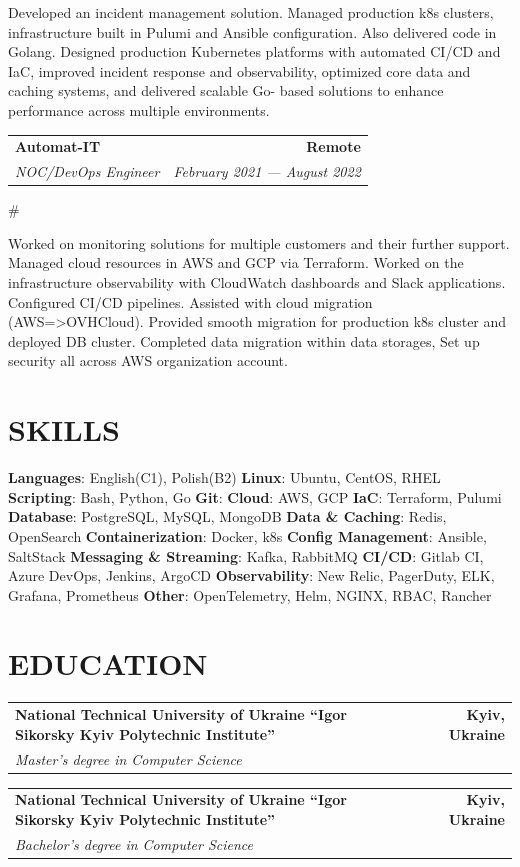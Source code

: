 \documentclass[letterpaper,11pt]{article}
\makeatletter
\newcommand{\resumeSubheadingSimple}[4]{
  \vspace{-1pt}
    \begin{tabular*}{\textwidth}[t]{l@{\extracolsep{\fill}}r}
      \textbf{#1} & \textbf{#2} \\
      \textit{\small#3} & \textit{\small #4} \\
    \end{tabular*}\vspace{-10pt}
}
\newcommand{\mySkip}[0]{
    \smallskip
    \smallskip
    \smallskip
}
\makeatother
\begin{document}
  \smallskip
  \smallskip
Developed an incident management solution. Managed production
k8s clusters, infrastructure built in Pulumi and Ansible configuration. Also delivered code in Golang.
Designed production Kubernetes platforms with automated CI/CD and IaC, improved
incident response and observability, optimized core data and caching systems, and delivered scalable Go-
based solutions to enhance performance across multiple
environments.
  \smallskip
  \smallskip

\resumeSubheadingSimple
  {Automat-IT}{Remote}
  {NOC/DevOps Engineer}{February 2021 --- August 2022}
 #

 
  \smallskip
  \smallskip
Worked on monitoring solutions for multiple customers and their further support. Managed cloud
resources in AWS and GCP via Terraform. Worked on the infrastructure observability with CloudWatch dashboards and
Slack applications. Configured CI/CD pipelines. Assisted with cloud migration (AWS=>OVHCloud). Provided smooth migration for production k8s cluster
and deployed DB cluster. Completed data migration within data storages, Set up security all across AWS
organization account.
  \smallskip
\section{SKILLS}
\begingroup
\parindent=0pt
\textbf{Languages}: English(C1), Polish(B2) \hspace{1em}
\textbf{Linux}: Ubuntu, CentOS, RHEL \hspace{1em} 
\textbf{Scripting}: Bash, Python, Go \hspace{1em} 
\textbf{Git}:  \hspace{1em} 
\textbf{Cloud}: AWS, GCP \hspace{1em} 
\textbf{IaC}: Terraform, Pulumi \hspace{1em} 
\textbf{Database}: PostgreSQL, MySQL, MongoDB\hspace{1em} 
\textbf{Data & Caching}: Redis, OpenSearch \hspace{1em} 
\textbf{Containerization}: Docker, k8s \hspace{1em}
\textbf{Config Management}: Ansible, SaltStack \hspace{1em} 
\textbf{Messaging & Streaming}: Kafka, RabbitMQ \hspace{1em} 
\textbf{CI/CD}: Gitlab CI, Azure DevOps, Jenkins, ArgoCD \hspace{1em} 
\textbf{Observability}: New Relic, PagerDuty, ELK, Grafana, Prometheus\hspace{1em} 
\textbf{Other}: OpenTelemetry, Helm, NGINX, RBAC, Rancher
\endgroup

\section{EDUCATION}
    \smallskip
    \resumeSubheadingSimple
      {National Technical University of Ukraine “Igor Sikorsky Kyiv Polytechnic Institute”}{Kyiv, Ukraine}
      {Master's degree in Computer Science}{ }
    \smallskip  
    \smallskip
       \resumeSubheadingSimple
      {National Technical University of Ukraine “Igor Sikorsky Kyiv Polytechnic Institute”}{Kyiv, Ukraine}
      {Bachelor's degree in Computer Science}{ }
    \mySkip
\mySkip
\end{document}
